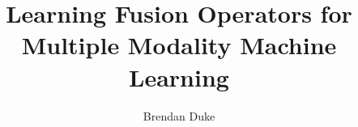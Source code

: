 \title{Learning Fusion Operators for Multiple Modality Machine Learning}


\author{Brendan Duke}












